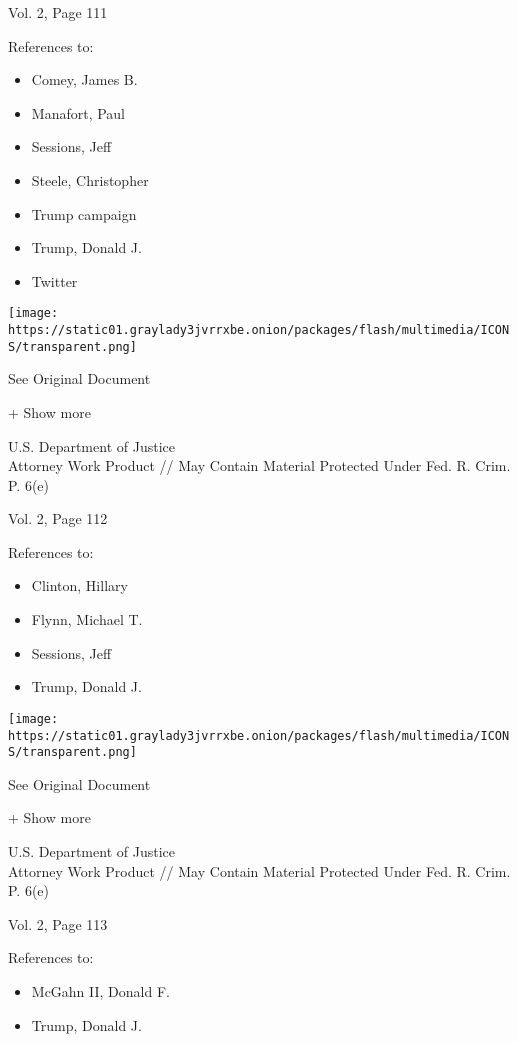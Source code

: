 Vol. 2, Page 111

References to:

\begin{itemize}
\tightlist
\item
  Comey, James B.
\item
  Manafort, Paul 
\item
  Sessions, Jeff
\item
  Steele, Christopher
\item
  Trump campaign
\item
  Trump, Donald J.
\item
  Twitter
\end{itemize}

\protect\hyperlink{}{}

\texttt{[image: https://static01.graylady3jvrrxbe.onion/packages/flash/multimedia/ICONS/transparent.png]}

See Original Document

+ Show more

U.S. Department of Justice\\
Attorney Work Product // May Contain Material Protected Under Fed. R.
Crim. P. 6(e)

Vol. 2, Page 112

References to:

\begin{itemize}
\tightlist
\item
  Clinton, Hillary
\item
  Flynn, Michael T.
\item
  Sessions, Jeff
\item
  Trump, Donald J.
\end{itemize}

\protect\hyperlink{}{}

\texttt{[image: https://static01.graylady3jvrrxbe.onion/packages/flash/multimedia/ICONS/transparent.png]}

See Original Document

+ Show more

U.S. Department of Justice\\
Attorney Work Product // May Contain Material Protected Under Fed. R.
Crim. P. 6(e)

Vol. 2, Page 113

References to:

\begin{itemize}
\tightlist
\item
  McGahn II, Donald F.
\item
  Trump, Donald J.
\end{itemize}

